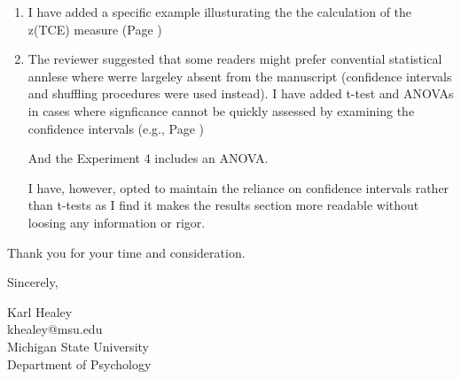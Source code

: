 \documentclass[12pt]{article}
\begin{document}
\begin{enumerate}
	\item
	I have added a specific example illusturating the the calculation of the z(TCE) measure  (Page \pageref{TODO-15})

	\item
	The reviewer suggested that some readers might prefer convential statistical annlese where werre largeley absent from the manuscript (confidence intervals and shuffling procedures were used instead). I have added t-test and ANOVAs in cases where signficance cannot be quickly assessed by examining the confidence intervals (e.g., Page \pageref{t1})

	And the Experiment 4 includes an ANOVA.

	I have, however, opted to maintain the reliance on confidence intervals rather than t-tests as I find it makes the results section more readable without loosing any information or rigor. 



	

\end{enumerate}





\vspace{20pt}

Thank you for your time and consideration.

\vspace{10pt}

Sincerely,

\vspace{10pt}

Karl Healey\\
khealey@msu.edu\\
Michigan State University\\
Department of Psychology

%
\end{document}
